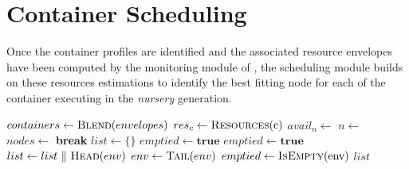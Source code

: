 
\section{Container Scheduling}
\label{sec:scheduling}

Once the container profiles are identified and the associated resource envelopes have been computed by the monitoring module of \GP{}, the scheduling module builds on these resources estimations to identify the best fitting node for each of the container executing in the \emph{nursery} generation.

\begin{algorithm}[ht!]
  \begin{algorithmic}[1]
        \State $containers \gets \Call{Blend}{envelopes}$\label{alg:scheduling:blend}
            \State $res_c \gets \Call{Resources}{$c$}$
            \label{alg:scheduling:find-best-node}
                \State $avail_n \gets$ 
                \label{alg:scheduling:pick-best-node}%
                    \State $n \gets$ \label{alg:scheduling:update-node}
                    \State $nodes \gets$ \label{alg:scheduling:shift}
                    \State {}\label{alg:scheduling:migrate}
                    \State \textbf{break}
                \EndIf
            \EndFor
            \State {}\label{alg:scheduling:escape}
        \EndFor
    \EndProcedure
    \vspace{5pt}
    \label{alg:scheduling:blend-begin}
        \State $list \gets \{\}$
        \State $emptied \gets \textbf{true}$
        \Repeat{}
            \State $emptied \gets \textbf{true}$
                    \State $list \gets list~\Vert~\Call{Head}{env}$ %
                    \State $env \gets \Call{Tail}{env}$ %
                    \State $emptied \gets \Call{IsEmpty}{$env$}$
                \EndIf
            \EndFor
        \State \Return $list$

\end{algorithmic}
\end{algorithm}
